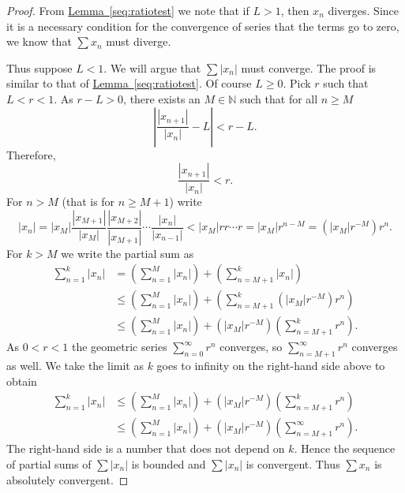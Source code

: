 \documentclass[12pt]{book}
\newcommand{\abs}[1]{\left\lvert {#1} \right\rvert}
\newcommand{\N}{{\mathbb{N}}}
\theoremstyle{plain}
\theoremstyle{remark}
\theoremstyle{definition}
\theoremstyle{exercise}
\theoremstyle{example}
\newcommand{\lemmaref}[1]{\hyperref[#1]{Lemma~\ref*{#1}}}
\begin{document}
\begin{proof}
From \lemmaref{seq:ratiotest} we note that if $L > 1$, then $x_n$
diverges.  Since it is a necessary condition for the convergence of series
that the terms go to zero, we know that $\sum x_n$ must diverge.

Thus suppose $L < 1$.
We will argue that $\sum \abs{x_n}$ must converge.
The proof is similar to that of \lemmaref{seq:ratiotest}.  Of course $L \geq
0$.  
Pick
$r$ such that $L < r < 1$.  As $r-L > 0$, there exists an $M \in \N$ such that for
all $n \geq M$
\begin{equation*}
\abs{\frac{\abs{x_{n+1}}}{\abs{x_n}} - L} < r-L .
\end{equation*}
Therefore,
\begin{equation*}
\frac{\abs{x_{n+1}}}{\abs{x_n}} < r .
\end{equation*}
For $n > M$ (that is for $n \geq M+1$)
write
\begin{equation*}
\abs{x_n} =
\abs{x_M}
\frac{\abs{x_{M+1}}}{\abs{x_{M}}}
\frac{\abs{x_{M+2}}}{\abs{x_{M+1}}}
\cdots
\frac{\abs{x_{n}}}{\abs{x_{n-1}}}
<
\abs{x_M}
r r \cdots r = \abs{x_M} r^{n-M} = (\abs{x_M} r^{-M}) r^n .
\end{equation*}
For $k > M$ we write the partial sum as
\begin{equation*}
\begin{split}
\sum_{n=1}^k \abs{x_n}
& =
\left(\sum_{n=1}^{M} \abs{x_n} \right)
+
\left(\sum_{n=M+1}^{k} \abs{x_n} \right)
\\
& \leq
\left(\sum_{n=1}^{M} \abs{x_n} \right)
+
\left(\sum_{n=M+1}^{k} 
(\abs{x_M} r^{-M}) r^n
\right)
\\
& \leq
\left(\sum_{n=1}^{M} \abs{x_n} \right)
+
(\abs{x_M} r^{-M})
\left( \sum_{n=M+1}^{k} r^n \right) .
\end{split}
\end{equation*}
As $0 < r < 1$ the geometric series
$\sum_{n=0}^{\infty} r^n$ converges, so
$\sum_{n=M+1}^{\infty} r^n$ converges as well.  We take the
limit as $k$ goes to infinity on the right-hand side above to obtain
\begin{equation*}
\begin{split}
\sum_{n=1}^k \abs{x_n}
& \leq
\left(\sum_{n=1}^{M} \abs{x_n} \right)
+
(\abs{x_M} r^{-M})
\left( \sum_{n=M+1}^{k} r^n \right) 
\\
& \leq
\left(\sum_{n=1}^{M} \abs{x_n} \right)
+
(\abs{x_M} r^{-M})
\left( \sum_{n=M+1}^{\infty} r^n \right) .
\end{split}
\end{equation*}
The right-hand side is a number that does not depend on $k$.
Hence the sequence of partial sums of $\sum \abs{x_n}$ is bounded
and $\sum \abs{x_n}$ is convergent.  Thus $\sum x_n$ is
absolutely convergent.
\end{proof}
\end{document}
